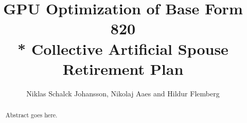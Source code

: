 \documentclass[oribibl]{llncs}
\begin{document}
\mainmatter    
\title{GPU Optimization of Base Form 820 \\* Collective Artificial Spouse Retirement Plan}

\author{Niklas Schalck Johansson, Nikolaj Aaes and Hildur Flemberg\\
}

\maketitle              %

\begin{abstract}
Abstract goes here.

\end{abstract}



\end{document}
